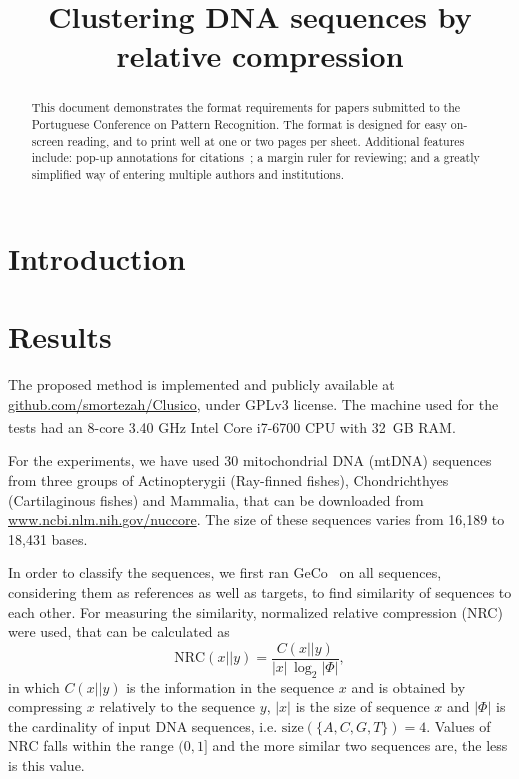 \documentclass[extendedabs]{recpad2k}
\title{Clustering DNA sequences by relative compression}
\begin{document}
\maketitle

\begin{abstract}
   This document demonstrates the format requirements for papers submitted
   to the Portuguese Conference on Pattern Recognition.  The format is designed for
   easy on-screen reading, and to print well at one or two pages per sheet.
   Additional features include: pop-up annotations for
   citations~\cite{Authors06,Mermin89}; a margin ruler for reviewing; and a
   greatly simplified way of entering multiple authors and institutions.
\end{abstract}

\section{Introduction}


\section{Results}
The proposed method is implemented and publicly available at \url{github.com/smortezah/Clusico}, under GPLv3 license. The machine used for the tests had an 8-core 3.40 GHz Intel\textsuperscript{\scriptsize\textregistered} Core{\scriptsize\texttrademark} i7-6700 CPU with 32~GB RAM.

For the experiments, we have used 30 mitochondrial DNA (mtDNA) sequences from three groups of Actinopterygii (Ray-finned fishes), Chondrichthyes (Cartilaginous fishes) and Mammalia, that can be downloaded from \url{www.ncbi.nlm.nih.gov/nuccore}. The size of these sequences varies from 16,189 to 18,431 bases.

In order to classify the sequences, we first ran GeCo~\cite{pratas2016efficient} on all sequences, considering them as references as well as targets, to find similarity of sequences to each other. For measuring the similarity, normalized relative compression (NRC) were used, that can be calculated as~\cite{pratas2018comparison}
\begin{equation}
   \mathrm{NRC} (x||y) = \frac{C (x||y)}{|x|\, \log_2 |\Phi|},
\end{equation}
in which $C (x||y)$ is the information in the sequence $x$ and is obtained by compressing $x$ relatively to the sequence $y$, $|x|$ is the size of sequence $x$ and $|\Phi|$ is the cardinality of input DNA sequences, i.e. $ \mathrm{size}(\{A, C, G, T\}) = 4 $. Values of NRC falls within the range $(0, 1]$ and the more similar two sequences are, the less is this value.
\end{document}
